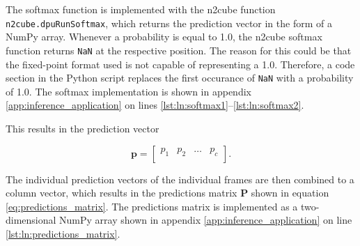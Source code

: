 The softmax function is implemented with the \acrshort{n2cube} function \texttt{n2cube.dpuRunSoftmax}, which returns the prediction vector in the form of a NumPy array.
Whenever a probability is equal to \num{1.0}, the \acrshort{n2cube} softmax function returns \texttt{NaN} at the respective position.
The reason for this could be that the fixed-point format used is not capable of representing a \num{1.0}.
Therefore, a code section in the Python script replaces the first occurance of \texttt{NaN} with a probability of \num{1.0}.
The softmax implementation is shown in appendix \ref{app:inference_application} on lines \ref{lst:ln:softmax1}--\ref{lst:ln:softmax2}.

This results in the prediction vector

\begin{equation}
  \boldsymbol{p} =
  \begin{bmatrix}
    p_1 & p_2 & \dots & p_c \\
  \end{bmatrix}.
  \label{eq:prediction_vector}
\end{equation}

The individual prediction vectors of the individual frames are then combined to a column vector, which results in the predictions matrix $\boldsymbol{P}$ shown in equation \ref{eq:predictions_matrix}.
The predictions matrix is implemented as a two-dimensional NumPy array shown in appendix \ref{app:inference_application} on line \ref{lst:ln:predictions_matrix}.

